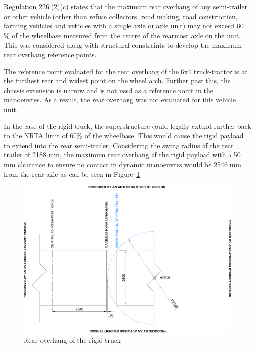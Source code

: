 Regulation 226 (2)(c) states that the maximum rear overhang of any semi-trailer or other vehicle (other than refuse collectors, road making, road construction, farming  vehicles and vehicles with a single axle or axle unit) may not exceed 60 \% of the wheelbase measured from the centre of the rearmost axle on the unit. This was considered along with structural constraints to develop the maximum rear overhang reference points.

The reference point evaluated for the rear overhang of the 6x4 truck-tractor is at the furthest rear and widest point on the wheel arch. Further past this, the chassis extension is narrow and is not used as a reference point in the manoeuvres. As a result, the rear overhang was not evaluated for this vehicle unit.

In the case of the rigid truck, the superstructure could legally extend further back to the NRTA limit of 60\% of the wheelbase. This would cause the rigid payload to extend into the rear semi-trailer. Considering the swing radius of the rear trailer of 2188 mm, the maximum rear overhang of the rigid payload with a 50 mm clearance to ensure no contact in dynamic manoeuvres would be 2546 mm from the rear axle as can be seen in Figure~\ref{figure:parameter-selection-rear-overhang-of-rigid-truck}

\begin{figure}[H]
	\centering
	\includegraphics[width=1\textwidth]{fig/parameter-selection_rear-overhang_rigid-truck}
	\caption{Rear overhang of the rigid truck}
	\label{figure:parameter-selection-rear-overhang-of-rigid-truck}
\end{figure}

